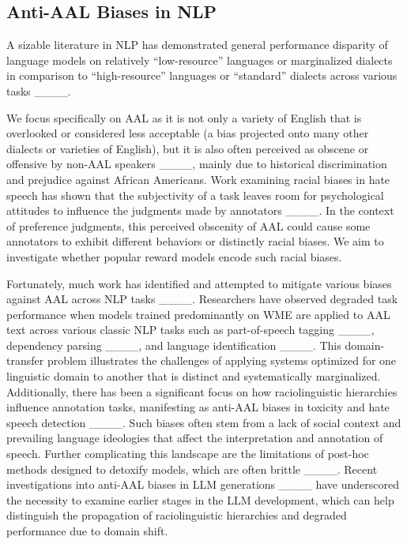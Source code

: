 \subsection{Anti-AAL Biases in NLP}
A sizable literature in NLP has demonstrated general performance disparity of language models on relatively ``low-resource'' languages or marginalized dialects in comparison to ``high-resource'' languages or ``standard'' dialects across various tasks ____. 

We focus specifically on AAL as it is not only a variety of English that is overlooked or considered less acceptable (a bias projected onto many other dialects or varieties of English), but it is also often perceived as obscene or offensive by non-AAL speakers ____, mainly due to historical discrimination and prejudice against African Americans. Work examining racial biases in hate speech has shown that the subjectivity of a task leaves room for psychological attitudes to influence the judgments made by annotators ____. In the context of preference judgments, this perceived obscenity of AAL could cause some annotators to exhibit different behaviors or distinctly racial biases. We aim to investigate whether popular reward models encode such racial biases.

Fortunately, much work has identified and attempted to mitigate various biases against AAL across NLP tasks ____. Researchers have observed degraded task performance when models trained predominantly on WME are applied to AAL text across various classic NLP tasks such as part-of-speech tagging ____, dependency parsing ____, and language identification ____. This domain-transfer problem illustrates the challenges of applying systems optimized for one linguistic domain to another that is distinct and systematically marginalized. Additionally, there has been a significant focus on how raciolinguistic hierarchies influence annotation tasks, manifesting as anti-AAL biases in toxicity and hate speech detection ____. Such biases often stem from a lack of social context and prevailing language ideologies that affect the interpretation and annotation of speech. Further complicating this landscape are the limitations of post-hoc methods designed to detoxify models, which are often brittle ____. Recent investigations into anti-AAL biases in LLM generations ____ have underscored the necessity to examine earlier stages in the LLM development, which can help distinguish the propagation of raciolinguistic hierarchies and degraded performance due to domain shift.